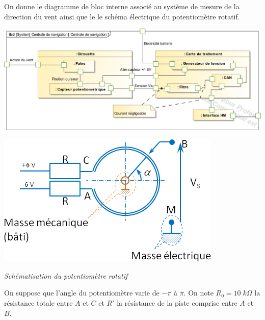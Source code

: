 \documentclass[10pt]{article}
\begin{document}
\vspace{.25cm}

On donne le diagramme de bloc interne associé au système de mesure de la direction du vent ainsi que le le schéma électrique du potentiomètre rotatif. 

\vspace{.25cm}

\begin{minipage}[c]{.55\linewidth}
\begin{center}
\includegraphics[width=\textwidth]{images/ibd}
\end{center}
\end{minipage}\hfill
\begin{minipage}[c]{.4\linewidth}
\begin{center}
\includegraphics[width=\textwidth]{images/capteur}

\textit{Schématisation du potentiomètre rotatif}
\end{center}
\end{minipage} 

\vspace{.25cm}

On suppose que l'angle du potentiomètre varie de $-\pi$ à $\pi$. On note $R_0= 10 \; k\Omega$ la résistance totale entre $A$ et $C$ et $R'$ la résistance de la piste comprise entre $A$ et $B$. 
\end{document}
